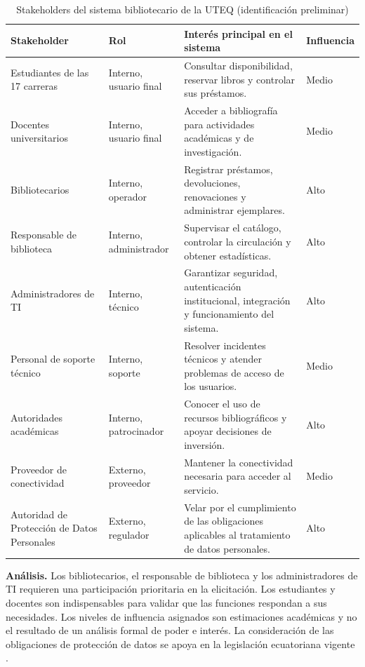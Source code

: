 \documentclass[conference,onecolumn]{IEEEtran}
\begin{document}
\begin{table}[H]
\caption{Stakeholders del sistema bibliotecario de la UTEQ (identificación preliminar)}
\label{tab:stakeholders}
\centering\footnotesize
\begin{tabularx}{\textwidth}{@{}p{}p{}Yp{0.09\textwidth}@{}}
\toprule
\textbf{Stakeholder} & \textbf{Rol} & \textbf{Interés principal en el sistema} & \textbf{Influencia}\\
\midrule
Estudiantes de las 17 carreras & Interno, usuario final & Consultar disponibilidad, reservar libros y controlar sus préstamos. & Medio\\
Docentes universitarios & Interno, usuario final & Acceder a bibliografía para actividades académicas y de investigación. & Medio\\
Bibliotecarios & Interno, operador & Registrar préstamos, devoluciones, renovaciones y administrar ejemplares. & Alto\\
Responsable de biblioteca & Interno, administrador & Supervisar el catálogo, controlar la circulación y obtener estadísticas. & Alto\\
Administradores de TI & Interno, técnico & Garantizar seguridad, autenticación institucional, integración y funcionamiento del sistema. & Alto\\
Personal de soporte técnico & Interno, soporte & Resolver incidentes técnicos y atender problemas de acceso de los usuarios. & Medio\\
Autoridades académicas & Interno, patrocinador & Conocer el uso de recursos bibliográficos y apoyar decisiones de inversión. & Alto\\
Proveedor de conectividad & Externo, proveedor & Mantener la conectividad necesaria para acceder al servicio. & Medio\\
Autoridad de Protección de Datos Personales & Externo, regulador & Velar por el cumplimiento de las obligaciones aplicables al tratamiento de datos personales. & Alto\\
\bottomrule
\end{tabularx}
\end{table}

\textbf{Análisis.} Los bibliotecarios, el responsable de biblioteca y los administradores de TI requieren una participación prioritaria en la elicitación. Los estudiantes y docentes son indispensables para validar que las funciones respondan a sus necesidades. Los niveles de influencia asignados son estimaciones académicas y no el resultado de un análisis formal de poder e interés. La consideración de las obligaciones de protección de datos se apoya en la legislación ecuatoriana vigente \cite{lopdp2021}.
\end{document}
